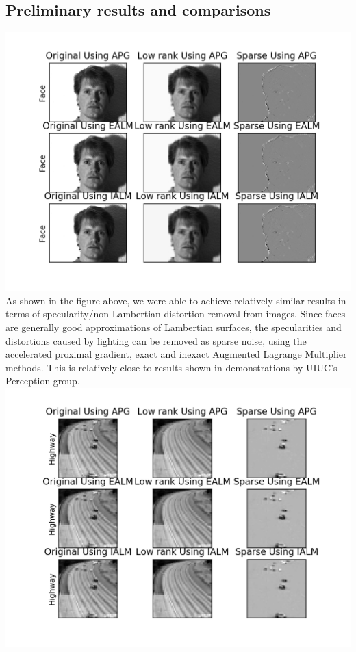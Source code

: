 \documentclass[oneside]{article}
\begin{document}
\subsection{Preliminary results and comparisons}
\includegraphics[scale =0.5]{face.png}\newline
As shown in the figure above, we were able to achieve relatively similar results in terms of specularity/non-Lambertian distortion removal from images. Since faces are generally good approximations of Lambertian surfaces, the specularities and distortions caused by lighting can be removed as sparse noise, using the accelerated proximal gradient, exact and inexact Augmented Lagrange Multiplier methods. This is relatively close to results shown in demonstrations by UIUC's Perception group.\newline
\includegraphics[scale =0.5]{highway.png}
\end{document}
